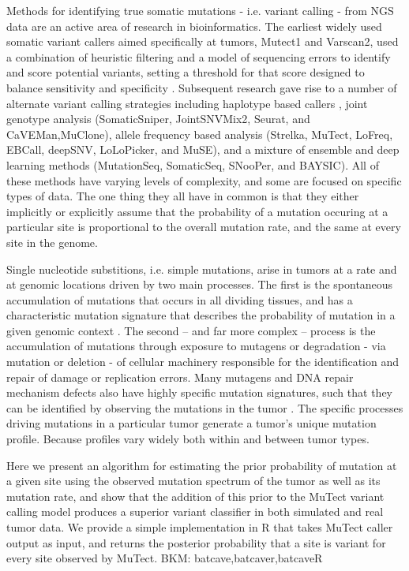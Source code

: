 \documentclass[a4,center,fleqn]{NAR}
\newcommand{\bkmcomment}[1]{{\color{blue}BKM: #1}}
\begin{document}
Methods for identifying true somatic mutations - i.e. variant calling -  from NGS data are an active area of research in bioinformatics.
The earliest widely used somatic variant callers aimed specifically at tumors, Mutect1 and Varscan2, used a combination of heuristic filtering and a model of sequencing errors to identify and score potential variants, setting a threshold for that score designed to balance sensitivity and specificity \citep{Koboldt2012,Cibulskis2013}.
Subsequent research gave rise to a number of alternate variant calling strategies including haplotype based callers \citep{Garrison2012},
joint genotype analysis (SomaticSniper, JointSNVMix2, Seurat, and CaVEMan,MuClone)\citep{Larson2012,Roth2012a,Christoforides2013,Jones2016,Dorri2019}, allele frequency based analysis (Strelka, MuTect, LoFreq, EBCall, deepSNV, LoLoPicker, and MuSE)\citep{Saunders2012,Wilm2012,Shiraishi2013b,Gerstung2012,Carrot-Zhang2017,Fan2016}, and a mixture of ensemble and deep learning methods (MutationSeq, SomaticSeq, SNooPer, and BAYSIC).
All of these methods have varying levels of complexity, and some are focused on specific types of data.
The one thing they all have in common is that they either implicitly or explicitly assume that the probability of a mutation occuring at a particular site is proportional to the overall mutation rate, and the same at every site in the genome.

Single nucleotide substitions, i.e. simple mutations, arise in tumors at a rate and at genomic locations driven by two main processes. 
The first is the spontaneous accumulation of mutations that occurs in all dividing tissues, and has a characteristic mutation signature that describes the probability of mutation in a given genomic context \citep{Nik-Zainal2012a,Alexandrov2015,Lee-Six2018}. 
The second -- and far more complex -- process is the accumulation of mutations through exposure to mutagens or degradation - via mutation or deletion - of cellular machinery responsible for the identification and repair of damage or replication errors. 
Many mutagens and DNA repair mechanism defects also have highly specific mutation signatures, such that they can be identified by observing the mutations in the tumor \citep{Alexandrov2013a,Helleday2014a,Nik-Zainal2016,Kandoth2013,Alexandrov2016}.
The specific processes driving mutations in a particular tumor generate a tumor's unique mutation profile.
Because profiles vary widely both within and between tumor types.

Here we present an algorithm for estimating the prior probability of mutation at a given site using the observed mutation spectrum of the tumor as well as its mutation rate, and show that the addition of this prior to the MuTect variant calling model produces a superior variant classifier in both simulated and real tumor data.
We provide a simple implementation in R that takes MuTect caller output as input, and returns the posterior probability that a site is variant for every site observed by MuTect. \bkmcomment{batcave,batcaver,batcaveR}
\end{document}
